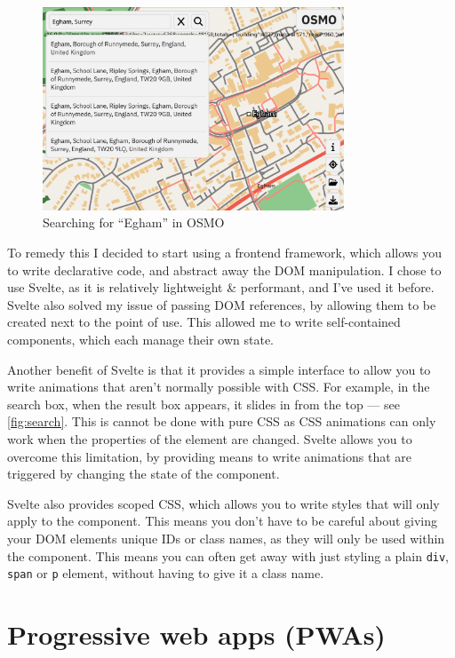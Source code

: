 \documentclass[hyphens]{final_report}
\begin{document}
\begin{figure}[ht]
    \centering
    \includegraphics[width=0.8\textwidth]{images/search.png}
    \caption{Searching for ``Egham'' in OSMO}\label{fig:search}
\end{figure}


To remedy this I decided to start using a frontend framework, which allows you to write declarative code, and abstract away the DOM manipulation. I chose to use Svelte, as it is relatively lightweight \& performant, and I've used it before. Svelte also solved my issue of passing DOM references, by allowing them to be created next to the point of use. This allowed me to write self-contained components, which each manage their own state. 

Another benefit of Svelte is that it provides a simple interface to allow you to write animations that aren't normally possible with CSS\@. For example, in the search box, when the result box appears, it slides in from the top --- see \autoref{fig:search}. This is cannot be done with pure CSS as CSS animations can only work when the properties of the element are changed. Svelte allows you to overcome this limitation, by providing means to write animations that are triggered by changing the state of the component.

Svelte also provides scoped CSS, which allows you to write styles that will only apply to the component. This means you don't have to be careful about giving your DOM elements unique IDs or class names, as they will only be used within the component. This means you can often get away with just styling a plain \texttt{div}, \texttt{span} or \texttt{p} element, without having to give it a class name. 

\section{Progressive web apps (PWAs)}
\end{document}
